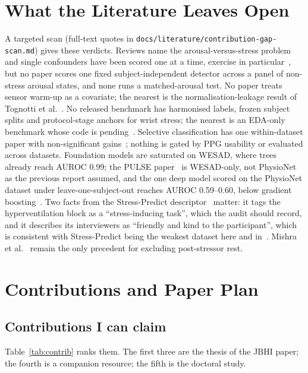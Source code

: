 \documentclass[journal]{IEEEtran}
\begin{document}
\section{What the Literature Leaves Open}
A targeted scan (full-text quotes in \texttt{docs/literature/contribution-gap-scan.md}) gives these verdicts. Reviews name the arousal-versus-stress problem~\cite{sosa2026} and single confounders have been scored one at a time, exercise in particular~\cite{aydogan2026,kwon2026}, but no paper scores one fixed subject-independent detector across a panel of non-stress arousal states, and none runs a matched-arousal test. No paper treats sensor warm-up as a covariate; the nearest is the normalisation-leakage result of Tognotti et al.~\cite{tognotti2026}. No released benchmark has harmonised labels, frozen subject splits and protocol-stage anchors for wrist stress; the nearest is an EDA-only benchmark whose code is pending~\cite{liuning2026}. Selective classification has one within-dataset paper with non-significant gains~\cite{farahani2026}; nothing is gated by PPG usability or evaluated across datasets. Foundation models are saturated on WESAD, where trees already reach AUROC 0.99; the PULSE paper~\cite{zhao2025} is WESAD-only, not PhysioNet as the previous report assumed, and the one deep model scored on the PhysioNet dataset under leave-one-subject-out reaches AUROC 0.59--0.60, below gradient boosting~\cite{akkaya2026}. Two facts from the Stress-Predict descriptor~\cite{iqbal2022} matter: it tags the hyperventilation block as a ``stress-inducing task'', which the audit should record, and it describes its interviewers as ``friendly and kind to the participant'', which is consistent with Stress-Predict being the weakest dataset here and in~\cite{kwon2026}. Mishra et al.~\cite{mishra2020} remain the only precedent for excluding post-stressor rest.

\section{Contributions and Paper Plan}
\subsection{Contributions I can claim}
Table~\ref{tab:contrib} ranks them. The first three are the thesis of the JBHI paper; the fourth is a companion resource; the fifth is the doctoral study.
\end{document}
